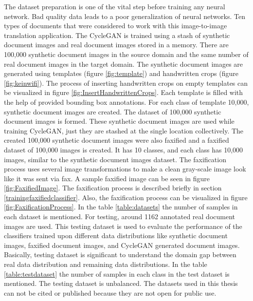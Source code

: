 The dataset preparation is one of the vital step before training any neural network. Bad quality data leads to a poor generalization of neural networks. Ten types of documents that were considered to work with this image-to-image translation application. The \ac{CycleGAN} is trained using a stash of synthetic document images and real document images stored in a memory. There are 100,000 synthetic document images in the source domain and the same number of real document images in the target domain. The synthetic document images are generated using templates (figure \ref{fig:template}) and handwritten crops (figure \ref{fig:keinwifi}). The process of inserting handwritten crops on empty templates can be visualized in figure \ref{fig:InsertHandwrittenCrops}. Each template is filled with the help of provided bounding box annotations\cite{lin2015microsoft}. For each class of template 10,000, synthetic document images are created. The dataset of 100,000 synthetic document images is formed. These synthetic document images are used while training \ac{CycleGAN}, just they are stashed at the single location collectively. The created 100,000 synthetic document images were also faxified and a faxified dataset of 100,000 images is created. It has 10 classes, and each class has 10,000 images, similar to the synthetic document images dataset. The faxification process uses several image transformations to make a clean gray-scale image look like it was sent via fax. A sample faxified image can be seen in figure \ref{fig:FaxifiedImage}. The faxification process is described briefly in section \ref{trainingfaxifiedclassifier}. Also, the faxification process can be visualized in figure \ref{fig:FaxificationProcess}. In the table \ref{table:datasets} the number of samples in each dataset is mentioned. For testing, around 1162 annotated real document images are used. This testing dataset is used to evaluate the performance of the classifiers trained upon different data distributions like synthetic document images, faxified document images, and \ac{CycleGAN} generated document images. Basically, testing dataset is significant to understand the domain gap between real data distribution and remaining data distributions. In the table \ref{table:testdataset} the number of samples in each class in the test dataset is mentioned. The testing dataset is unbalanced. The datasets used in this thesis can not be cited or published because they are not open for public use.

